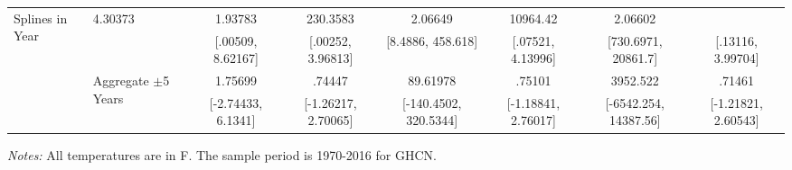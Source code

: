 \begin{landscape}
\begin{table}[htb]
\begin{threeparttable}
{\begin{tabular}{llcccccc}
\multirow{2}{*}{Splines in Year} & 4.30373 & 1.93783 & 230.3583 & 2.06649 & 10964.42 & 2.06602 \\  & & [.00509, 8.62167] & [.00252, 3.96813] & [8.4886, 458.618] & [.07521, 4.13996] & [730.6971, 20861.7] & [.13116, 3.99704] \\  & \multirow{2}{*}{Aggregate \(\pm\)5 Years} & 1.75699 & .74447 & 89.61978 & .75101 & 3952.522 & .71461 \\  & & [-2.74433, 6.1341] & [-1.26217, 2.70065] & [-140.4502, 320.5344] & [-1.18841, 2.76017] & [-6542.254, 14387.56] & [-1.21821, 2.60543] \\
\hline \hline
\end{tabular}
}
\begin{tablenotes}
\footnotesize \textit{Notes:} All temperatures are in \degree F. The sample period is 1970-2016 for GHCN.
\end{tablenotes}
\end{threeparttable}
\end{table}
\end{landscape}
\restoregeometry
